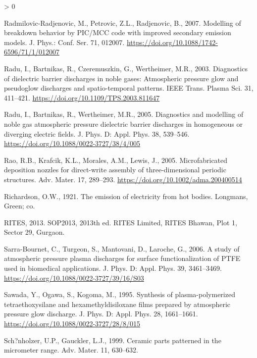 \documentclass[
  11pt,
  twoside]{article}
\newlength{\cslhangindent}
\newenvironment{CSLReferences}[2] %
 {%
  \setlength{\parindent}{0pt}
  \ifodd #1 \everypar{\setlength{\hangindent}{\cslhangindent}}\ignorespaces\fi
  \ifnum #2 > 0
  \setlength{\parskip}{#2\baselineskip}
  \fi
 }%
 {}
\begin{document}
\begin{CSLReferences}{1}{0}
\leavevmode\hypertarget{ref-Radm07}{}%
Radmilovic-Radjenovic, M., Petrovic, Z.L., Radjenovic, B., 2007. Modelling of breakdown behavior by {PIC/MCC} code with improved secondary emission models. J. Phys.: Conf. Ser. 71, 012007. \url{https://doi.org/10.1088/1742-6596/71/1/012007}

\leavevmode\hypertarget{ref-Radu03}{}%
Radu, I., Bartnikas, R., Czeremuszkin, G., Wertheimer, M.R., 2003. Diagnostics of dielectric barrier discharges in noble gases: Atmospheric pressure glow and pseudoglow discharges and spatio-temporal patterns. IEEE Trans. Plasma Sci. 31, 411--421. \url{https://doi.org/10.1109/TPS.2003.811647}

\leavevmode\hypertarget{ref-Radu05}{}%
Radu, I., Bartnikas, R., Wertheimer, M.R., 2005. Diagnostics and modelling of noble gas atmospheric pressure dielectric barrier discharges in homogeneous or diverging electric fields. J. Phys. D: Appl. Phys. 38, 539--546. \url{https://doi.org/10.1088/0022-3727/38/4/005}

\leavevmode\hypertarget{ref-Rao05}{}%
Rao, R.B., Krafcik, K.L., Morales, A.M., Lewis, J., 2005. Microfabricated deposition nozzles for direct-write assembly of three-dimensional periodic structures. Adv. Mater. 17, 289--293. \url{https://doi.org/10.1002/adma.200400514}

\leavevmode\hypertarget{ref-Rich1921}{}%
Richardson, O.W., 1921. The emission of electricity from hot bodies. Longmans, Green; co.

\leavevmode\hypertarget{ref-SOP2013RITES}{}%
RITES, 2013. SOP2013, 2013th ed. RITES Limited, RITES Bhawan, Plot 1, Sector 29, Gurgaon.

\leavevmode\hypertarget{ref-Sarr06}{}%
Sarra-Bournet, C., Turgeon, S., Mantovani, D., Laroche, G., 2006. A study of atmospheric pressure plasma discharges for surface functionalization of {PTFE} used in biomedical applications. J. Phys. D: Appl. Phys. 39, 3461--3469. \url{https://doi.org/10.1088/0022-3727/39/16/S03}

\leavevmode\hypertarget{ref-Sawa1995}{}%
Sawada, Y., Ogawa, S., Kogoma, M., 1995. Synthesis of plasma-polymerized tetraethoxysilane and hexamethyldisiloxane films prepared by atmospheric pressure glow discharge. J. Phys. D: Appl. Phys. 28, 1661--1661. \url{https://doi.org/10.1088/0022-3727/28/8/015}

\leavevmode\hypertarget{ref-Scho1999}{}%
Sch?nholzer, U.P., Gauckler, L.J., 1999. Ceramic parts patterned in the micrometer range. Adv. Mater. 11, 630--632.


\end{CSLReferences}
\end{document}
